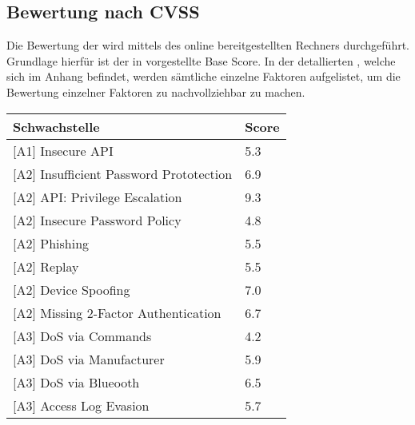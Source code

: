 \subsection{Bewertung nach CVSS}
\label{sec:analysis_cvss}
    Die Bewertung der  wird mittels des online bereitgestellten Rechners\cite{CvssCalc} durchgeführt.
	Grundlage hierfür ist der in  vorgestellte Base Score.
	In der detallierten , welche sich im Anhang befindet, werden sämtliche einzelne Faktoren aufgelistet, um die Bewertung einzelner Faktoren zu nachvollziehbar zu machen.

    \begin{table}[H]
        \centering
        \sffamily
        \begin{tabular}{|l|l|}
        \hline
\textbf{Schwachstelle}                      & \textbf{Score} \\ \hline
\rowcolor{light-gray}
{[}A1{]} Insecure API                       & \cellcolor{orange}5.3            \\ \hline
{[}A2{]} Insufficient Password Prototection & \cellcolor{orange}6.9            \\ \hline
\rowcolor{light-gray}
{[}A2{]} API: Privilege Escalation          & \cellcolor{red}9.3            \\ \hline
{[}A2{]} Insecure Password Policy           & \cellcolor{orange}4.8            \\ \hline
\rowcolor{light-gray}
{[}A2{]} Phishing                           & \cellcolor{orange}5.5            \\ \hline
{[}A2{]} Replay                             & \cellcolor{orange}5.5            \\ \hline
\rowcolor{light-gray}
{[}A2{]} Device Spoofing                    & \cellcolor{redorange}7.0            \\ \hline
{[}A2{]} Missing 2-Factor Authentication    & \cellcolor{orange}6.7            \\ \hline
\rowcolor{light-gray}
{[}A3{]} DoS via Commands                   & \cellcolor{orange}4.2            \\ \hline
{[}A3{]} DoS via Manufacturer               & \cellcolor{orange}5.9            \\ \hline
\rowcolor{light-gray}
{[}A3{]} DoS via Blueooth                   & \cellcolor{orange}6.5            \\ \hline
{[}A3{]} Access Log Evasion                 & \cellcolor{orange}5.7            \\ \hline

\end{tabular}
\end{table}
